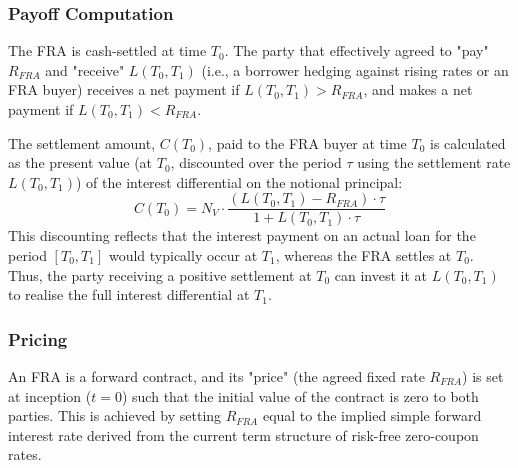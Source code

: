 \documentclass[11pt, a4paper, british]{article}
\begin{document}
\subsubsection{Payoff Computation}

The FRA is cash-settled at time $T_0$. The party that effectively agreed to "pay" $R_{FRA}$ and "receive" $L(T_0, T_1)$ (i.e., a borrower hedging against rising rates or an FRA buyer) receives a net payment if $L(T_0, T_1) > R_{FRA}$, and makes a net payment if $L(T_0, T_1) < R_{FRA}$.

The settlement amount, $C(T_0)$, paid to the FRA buyer at time $T_0$ is calculated as the present value (at $T_0$, discounted over the period $\tau$ using the settlement rate $L(T_0, T_1)$) of the interest differential on the notional principal:
\begin{equation}
 C(T_0) = N_V \cdot \frac{(L(T_0, T_1) - R_{FRA}) \cdot \tau}{1 + L(T_0, T_1) \cdot \tau}
 \label{eq:FRASettlement_rigorous}
\end{equation}
This discounting reflects that the interest payment on an actual loan for the period $[T_0, T_1]$ would typically occur at $T_1$, whereas the FRA settles at $T_0$. Thus, the party receiving a positive settlement at $T_0$ can invest it at $L(T_0, T_1)$ to realise the full interest differential at $T_1$.


\subsubsection{Pricing}
An FRA is a forward contract, and its "price" (the agreed fixed rate $R_{FRA}$) is set at inception ($t=0$) such that the initial value of the contract is zero to both parties. This is achieved by setting $R_{FRA}$ equal to the implied simple forward interest rate derived from the current term structure of risk-free zero-coupon rates.
\end{document}
